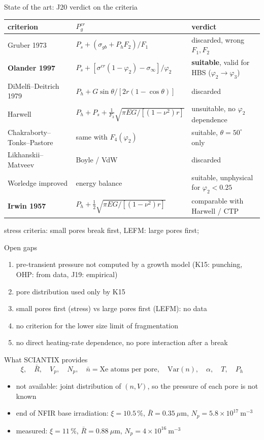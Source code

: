 \documentclass[10pt,aspectratio=169]{beamer}
\begin{document}
\begin{frame}{State of the art: J20 verdict on the criteria}
\scriptsize
\begin{tabular}{lll}
\toprule
criterion & $P_g^{cr}$ & verdict\\
\midrule
Gruber 1973 & $P_s+(\sigma_{gb}+P_hF_2)/F_1$ & discarded, wrong $F_1,F_2$\\
\textbf{Olander 1997} & $P_s+[\sigma^{cr}(1-\varphi_2)-\sigma_\infty]/\varphi_2$ & \textbf{suitable}, valid for HBS ($\varphi_2\to\varphi_3$)\\
DiMelfi--Deitrich 1979 & $P_h+G\sin\theta/[2r(1-\cos\theta)]$ & discarded\\
Harwell & $P_h+P_s+\frac1{F_3}\sqrt{\pi EG/[(1-\nu^2)r]}$ & unsuitable, no $\varphi_2$ dependence\\
Chakraborty--Tonks--Pastore & same with $F_4(\varphi_2)$ & suitable, $\theta=50^\circ$ only\\
Likhanskii--Matveev & Boyle / VdW & discarded\\
Worledge improved & energy balance & suitable, unphysical for $\varphi_2<0.25$\\
\textbf{Irwin 1957} & $P_h+\frac12\sqrt{\pi EG/[(1-\nu^2)r]}$ & comparable with Harwell / CTP\\
\bottomrule
\end{tabular}
\vspace{4pt}

stress criteria: small pores break first, LEFM: large pores first; 

Open gaps
\begin{enumerate}\small
\item pre-transient pressure not computed by a growth model (K15: punching, OHP: from data, J19: empirical)
\item pore distribution used only by K15
\item small pores first (stress) vs large pores first (LEFM): no data
\item no criterion for the lower size limit of fragmentation
\item no direct heating-rate dependence, no pore interaction after a break
\end{enumerate}
\end{frame}

\begin{frame}{What SCIANTIX provides}
\[
\xi,\quad \bar R,\quad V_p,\quad N_p,\quad \bar n=\text{Xe atoms per pore},\quad \mathrm{Var}(n),\quad \alpha,\quad T,\quad P_h
\]
\begin{itemize}\small
\item not available: joint distribution of $(n,V)$, so the pressure of each pore is not known
\item end of NFIR base irradiation: $\xi=10.5\,\%$, $\bar R=0.35\ \mu$m, $N_p=5.8\times10^{17}\ \mathrm{m^{-3}}$
\item measured: $\xi=11\,\%$, $\bar R=0.88\ \mu$m, $N_p=4\times10^{16}\ \mathrm{m^{-3}}$
\end{itemize}
\end{frame}
\end{document}
